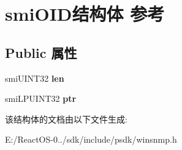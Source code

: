 \hypertarget{structsmi_o_i_d}{}\section{smi\+O\+I\+D结构体 参考}
\label{structsmi_o_i_d}
\subsection*{Public 属性}
\begin{DoxyCompactItemize}
\item 
\mbox{\label{structsmi_o_i_d_a15880974000b58180d305b2506fbfc9a}} 
smi\+U\+I\+N\+T32 {\bfseries len}
\item 
\mbox{\label{structsmi_o_i_d_ae0a34459213cff72114560fafb26c283}} 
smi\+L\+P\+U\+I\+N\+T32 {\bfseries ptr}
\end{DoxyCompactItemize}


该结构体的文档由以下文件生成\+:\begin{DoxyCompactItemize}
\item 
E\+:/\+React\+O\+S-\/0../sdk/include/psdk/winsnmp.\+h\end{DoxyCompactItemize}
